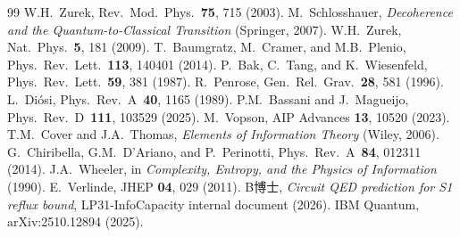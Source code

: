 \documentclass[reprint]{revtex4-2}
\begin{document}
\begin{thebibliography}{99}
 W.H.~Zurek, Rev.~Mod.~Phys.~\textbf{75}, 715 (2003).
 M.~Schlosshauer, \emph{Decoherence and the Quantum-to-Classical Transition} (Springer, 2007).
 W.H.~Zurek, Nat.~Phys.~\textbf{5}, 181 (2009).
 T.~Baumgratz, M.~Cramer, and M.B.~Plenio, Phys.~Rev.~Lett.~\textbf{113}, 140401 (2014).
 P.~Bak, C.~Tang, and K.~Wiesenfeld, Phys.~Rev.~Lett.~\textbf{59}, 381 (1987).
 R.~Penrose, Gen.~Rel.~Grav.~\textbf{28}, 581 (1996).
 L.~Di\'osi, Phys.~Rev.~A~\textbf{40}, 1165 (1989).
 P.M.~Bassani and J.~Magueijo, Phys.~Rev.~D~\textbf{111}, 103529 (2025).
 M.~Vopson, AIP Advances \textbf{13}, 10520 (2023).
 T.M.~Cover and J.A.~Thomas, \emph{Elements of Information Theory} (Wiley, 2006).
 G.~Chiribella, G.M.~D'Ariano, and P.~Perinotti, Phys.~Rev.~A~\textbf{84}, 012311 (2014).
 J.A.~Wheeler, in \emph{Complexity, Entropy, and the Physics of Information} (1990).
 E.~Verlinde, JHEP \textbf{04}, 029 (2011).
 B博士, \emph{Circuit QED prediction for S1 reflux bound}, LP31-InfoCapacity internal document (2026).
 IBM Quantum, arXiv:2510.12894 (2025).
\end{thebibliography}
\end{document}
